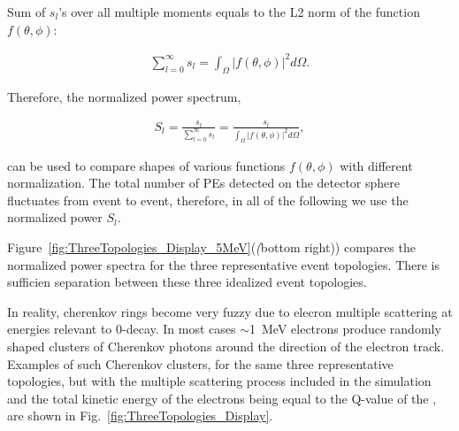 Sum of $s_l$'s over all multiple moments equals to the L2 norm of the function $f(\theta,\phi)$:

\begin{eqnarray}
\label{eq5}
\sum_{l=0}^{\infty} s_l = \int_{\Omega} |f(\theta,\phi)|^2 d\Omega.
\end{eqnarray}

Therefore, the normalized power spectrum,

\begin{eqnarray}
\label{eq6}
S_l = \frac{s_l}{\sum_{l=0}^{\infty} s_l} =  \frac{s_l}{\int_{\Omega} |f(\theta,\phi)|^2 d\Omega},
\end{eqnarray}

can be used to compare shapes of various functions $f(\theta,\phi)$ with different normalization. The total number of PEs detected on the detector sphere fluctuates from event to event, therefore, in all of the following we use the normalized power $S_l$.

Figure~\ref{fig:ThreeTopologies_Display_5MeV}(\emph(bottom right)) compares the normalized power spectra for the three representative event topologies.
There is sufficien separation between these three idealized event topologies.

In reality, cherenkov rings become very fuzzy due to elecron multiple scattering at energies relevant to 0\nbb-decay. In most cases $\sim$1~MeV 
electrons produce randomly shaped clusters of Cherenkov photons around the direction of the electron track. Examples of such Cherenkov clusters, 
for the same three representative topologies, but with the multiple scattering process included in the simulation and the total kinetic energy of 
the electrons being equal to the Q-value of the \Te, are shown in Fig.~\ref{fig:ThreeTopologies_Display}.


